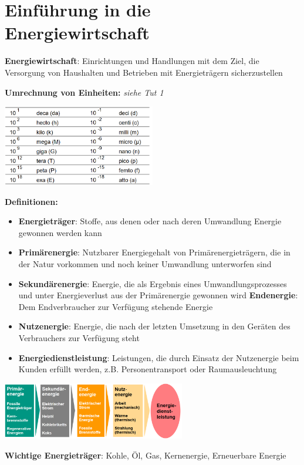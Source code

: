 \section{Einführung in die Energiewirtschaft}

\textbf{Energiewirtschaft}: Einrichtungen und Handlungen mit dem Ziel, die Versorgung von Haushalten und Betrieben mit Energieträgern sicherzustellen

\textbf{Umrechnung von Einheiten:} \textit{siehe Tut 1}
\begin{center}
	\includegraphics[width=0.5\textwidth]{images/units.png}
\end{center}

\textbf{Definitionen:}
\begin{itemize}
	\item \textbf{Energieträger}: Stoffe, aus denen oder nach deren Umwandlung Energie gewonnen werden kann
	\item \textbf{Primärenergie}: Nutzbarer Energiegehalt von Primärenergieträgern, die in der Natur vorkommen und noch keiner Umwandlung unterworfen sind
	\item \textbf{Sekundärenergie}: Energie, die als Ergebnis eines Umwandlungsprozesses und unter Energieverlust aus der Primärenergie gewonnen wird
	\textbf{Endenergie}: Dem Endverbraucher zur Verfügung stehende Energie
	\item \textbf{Nutzenergie}: Energie, die nach der letzten Umsetzung in den Geräten des Verbrauchers zur Verfügung steht
	\item \textbf{Energiedienstleistung}: Leistungen, die durch Einsatz der Nutzenergie beim Kunden erfüllt werden, z.B. Personentransport oder Raumausleuchtung
\end{itemize}
\begin{center}
	\includegraphics[width=0.6\textwidth]{images/energy-chain.png}
\end{center}

\textbf{Wichtige Energieträger}: Kohle, Öl, Gas, Kernenergie, Erneuerbare Energie